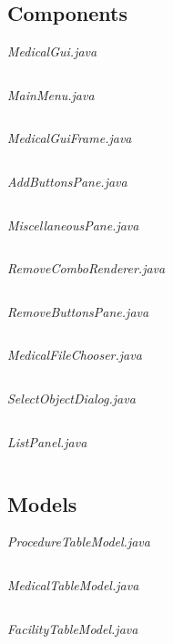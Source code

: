 \documentclass{article}
\begin{document}
\subsection{Components}\label{subsec:components} %
\textit{MedicalGui.java}
\inputminted{java}{./src/main/java/com/yvesstraten/medicalconsolegui/MedicalGui.java}

\textit{MainMenu.java}
\inputminted{java}{./src/main/java/com/yvesstraten/medicalconsolegui/components/MainMenu.java}

\textit{MedicalGuiFrame.java}
\inputminted{java}{./src/main/java/com/yvesstraten/medicalconsolegui/components/MedicalGuiFrame.java}

\textit{AddButtonsPane.java}
\inputminted{java}{./src/main/java/com/yvesstraten/medicalconsolegui/components/AddButtonsPane.java}

\textit{MiscellaneousPane.java}
\inputminted{java}{./src/main/java/com/yvesstraten/medicalconsolegui/components/MiscellaneousPane.java}

\textit{RemoveComboRenderer.java}
\inputminted{java}{./src/main/java/com/yvesstraten/medicalconsolegui/RemoveComboRenderer.java}

\textit{RemoveButtonsPane.java}
\inputminted{java}{./src/main/java/com/yvesstraten/medicalconsolegui/components/RemoveButtonsPane.java}

\textit{MedicalFileChooser.java}
\inputminted{java}{./src/main/java/com/yvesstraten/medicalconsolegui/components/MedicalFileChooser.java}

\textit{SelectObjectDialog.java}
\inputminted{java}{./src/main/java/com/yvesstraten/medicalconsolegui/components/SelectObjectDialog.java}

\textit{ListPanel.java}
\inputminted{java}{./src/main/java/com/yvesstraten/medicalconsolegui/components/ListPanel.java}

\subsection{Models}\label{sec:models} %
\textit{ProcedureTableModel.java}
\inputminted{java}{./src/main/java/com/yvesstraten/medicalconsolegui/models/ProcedureTableModel.java}

\textit{MedicalTableModel.java}
\inputminted{java}{./src/main/java/com/yvesstraten/medicalconsolegui/models/MedicalTableModel.java}


\textit{FacilityTableModel.java}
\inputminted{java}{./src/main/java/com/yvesstraten/medicalconsolegui/models/FacilityTableModel.java}
\end{document}
